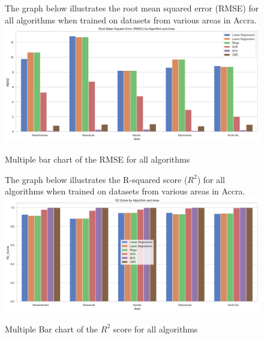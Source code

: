 \documentclass{book}
\numberwithin{equation}{section}
\numberwithin{figure}{section}
\begin{document}
\begin{figure}[H]
 \begin{minipage}{\linewidth}
        The graph below illustrates the root mean squared error (RMSE) for all algorithms when trained on datasets from various areas in Accra.
        \vspace{0.5em} 
        \includegraphics[width=\linewidth]{RMSE of all areas.png}
       
        \caption{ Multiple bar chart of the RMSE for all algorithms}
        \label{fig: Bar chart of the RMSE for all algorithms}
    \end{minipage}
\end{figure}
\begin{figure}[H]
 \begin{minipage}{\linewidth}
        The graph below illustrates the R-squared score ($R^{2}$) for all algorithms when trained on datasets from various areas in Accra.
        \vspace{0.5em} 
        \includegraphics[width=\linewidth]{r2 score.png}
       
        \caption{ Multiple Bar chart of the $R^{2}$ score for all algorithms}
        \label{fig: Bar chart of the $R^{2}$ score  for all algoritms}
    \end{minipage}
\end{figure}
\end{document}
